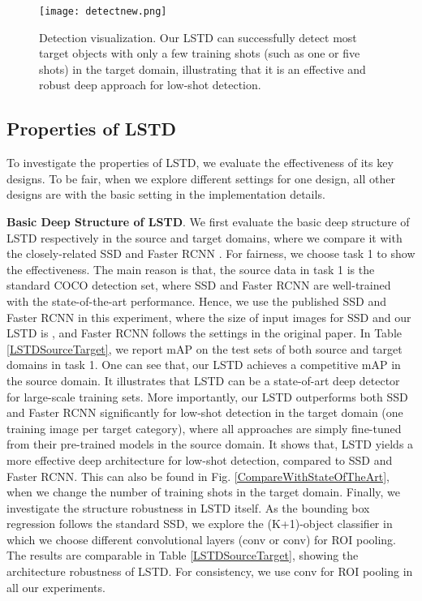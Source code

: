 \documentclass[letterpaper]{article} \usepackage{aaai18}  \usepackage{times}  \usepackage{helvet}  \usepackage{courier}  \usepackage{url}  \usepackage{graphicx}
\begin{document}
\begin{figure*}
\centering
\texttt{[image: detectnew.png]}
\caption{Detection visualization.
Our LSTD can successfully detect most target objects with only a few training shots (such as one or five shots) in the target domain,
illustrating that it is an effective and robust deep approach for low-shot detection.}
\label{detectdifferentshot}
\end{figure*}


\subsection{Properties of LSTD}
To investigate the properties of LSTD,
we evaluate the effectiveness of its key designs.
To be fair,
when we explore different settings for one design,
all other designs are with the basic setting in the implementation details.


\textbf{Basic Deep Structure of LSTD}.
We first evaluate the basic deep structure of LSTD respectively in the source and target domains,
where we compare it with the closely-related SSD \cite{Liueccv2016} and Faster RCNN \cite{Renpami2016}.
For fairness,
we choose task 1 to show the effectiveness.
The main reason is that,
the source data in task 1 is the standard COCO detection set,
where SSD and Faster RCNN are well-trained with the state-of-the-art performance.
Hence,
we use the published SSD \cite{Liueccv2016} and Faster RCNN \cite{Renpami2016} in this experiment,
where
the size of input images for SSD and our LSTD is ,
and Faster RCNN follows the settings in the original paper.
In Table \ref{LSTDSourceTarget},
we report mAP on the test sets of both source and target domains in task 1.
One can see that,
our LSTD achieves a competitive mAP in the source domain.
It illustrates that LSTD can be a state-of-art deep detector for large-scale training sets.
More importantly,
our LSTD outperforms both SSD and Faster RCNN significantly for low-shot detection in the target domain (one training image per target category),
where
all approaches are simply fine-tuned from their pre-trained models in the source domain.
It shows that,
LSTD yields a more effective deep architecture for low-shot detection,
compared to SSD and Faster RCNN.
This can also be found in Fig. \ref{CompareWithStateOfTheArt},
when we change the number of training shots in the target domain.
Finally,
we investigate the structure robustness in LSTD itself.
As the bounding box regression follows the standard SSD,
we explore the (K+1)-object classifier in which we choose different convolutional layers (conv or conv) for ROI pooling.
The results are comparable in Table \ref{LSTDSourceTarget},
showing the architecture robustness of LSTD.
For consistency,
we use conv for ROI pooling in all our experiments.
\end{document}
